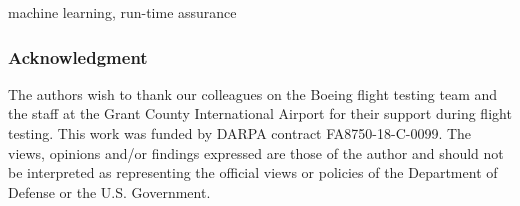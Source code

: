 \documentclass[conference]{IEEEtran}
\begin{document}
\begin{IEEEkeywords}
machine learning, run-time assurance
\end{IEEEkeywords}





















\subsubsection*{Acknowledgment}
The authors wish to thank our colleagues on the Boeing flight testing team and the staff 
at the Grant County International Airport for their support during flight testing.  
This work was funded by DARPA contract  FA8750-18-C-0099. The views, opinions and/or
findings expressed are those of the author and should not be interpreted as representing
the official views or policies of the Department of Defense or the U.S. Government.



\end{document}
